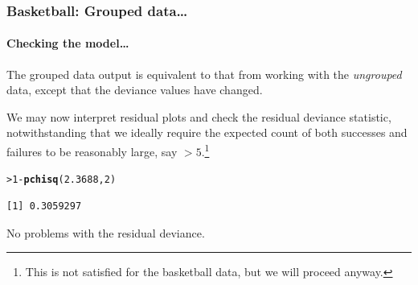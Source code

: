 \documentclass{beamer}\usepackage[]{graphicx}\usepackage[]{xcolor}
\makeatletter
\newcommand{\hlnum}[1]{\textcolor[rgb]{0.686,0.059,0.569}{#1}}%
\newcommand{\hlopt}[1]{\textcolor[rgb]{0,0,0}{#1}}%
\newcommand{\hlstd}[1]{\textcolor[rgb]{0.345,0.345,0.345}{#1}}%
\newcommand{\hlkwd}[1]{\textcolor[rgb]{0.737,0.353,0.396}{\textbf{#1}}}%
\newenvironment{kframe}{%
 \def\at@end@of@kframe{}%
 \ifinner\ifhmode%
  \def\at@end@of@kframe{\end{minipage}}%
  \begin{minipage}{\columnwidth}%
 \fi\fi%
 \def\FrameCommand##1{\hskip\@totalleftmargin \hskip-\fboxsep
 \colorbox{shadecolor}{##1}\hskip-\fboxsep
     \hskip-\linewidth \hskip-\@totalleftmargin \hskip\columnwidth}%
 \MakeFramed {\advance\hsize-\width
   \@totalleftmargin\z@ \linewidth\hsize
   \@setminipage}}%
 {\par\unskip\endMakeFramed%
 \at@end@of@kframe}
\newenvironment{knitrout}{}{} %
\makeatother
\begin{document}
\begin{frame}[fragile]
\frametitle{Basketball: Grouped data\ldots}
\framesubtitle{Checking the model\ldots}

The grouped data output is equivalent to that from working with the \emph{ungrouped} data, except that the deviance values have changed.
\bigskip


We may now interpret residual plots and check the residual deviance statistic, notwithstanding that we ideally require the expected count of both successes and failures to be reasonably large, say $>5$.\footnote{This is not satisfied for the basketball data, but we will proceed anyway.}
\medskip

\begin{knitrout}\scriptsize
{}\color{fgcolor}\begin{kframe}
\begin{alltt}
\hlstd{> }\hlnum{1} \hlopt{-} \hlkwd{pchisq}\hlstd{(}\hlnum{2.3688}\hlstd{,} \hlnum{2}\hlstd{)}
\end{alltt}
\begin{verbatim}
[1] 0.3059297
\end{verbatim}
\end{kframe}
\end{knitrout}
\medskip

No problems with the residual deviance.
\end{frame}
\end{document}
